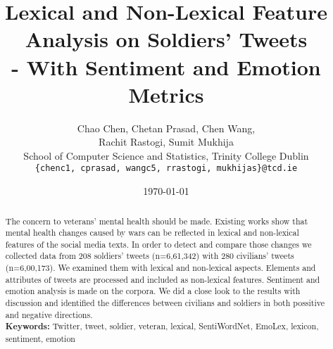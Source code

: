 \documentclass[english,a4paper,11pt]{article}
\title{Lexical and Non-Lexical Feature Analysis on Soldiers' Tweets\\- With Sentiment and Emotion Metrics}
\date{\today}
\author{
  Chao Chen, Chetan Prasad, Chen Wang, \\
  Rachit Rastogi, Sumit Mukhija \\
  School of Computer Science and Statistics, Trinity College Dublin\\
  \texttt{\{chenc1, cprasad, wangc5, rrastogi, mukhijas\}@tcd.ie}
}
\begin{document}
\maketitle
\thispagestyle{empty}
\pagestyle{empty}

\begin{abstract}
  The concern to veterans' mental health should be made. Existing works show that mental health changes caused by wars can be reflected in lexical and non-lexical features of the social media texts. In order to detect and compare those changes we collected data from 208 soldiers' tweets (n=6,61,342) with 280 civilians' tweets (n=6,00,173). We examined them with lexical and non-lexical aspects. Elements and attributes of tweets are processed and included as non-lexical features. Sentiment and emotion analysis is made on the corpora. We did a close look to the results with discussion and identified the differences between civilians and soldiers in both possitive and negative directions. \\
  \textbf{Keywords:} Twitter, tweet, soldier, veteran, lexical, SentiWordNet, EmoLex, lexicon, sentiment, emotion
\end{abstract}








\clearpage



\end{document}
